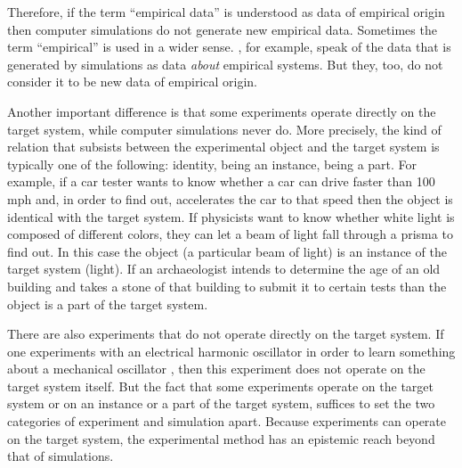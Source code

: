 \documentclass[12pt, a4paper]{article}
\numberwithin{equation}{section}
\begin{document}
Therefore, if the term ``empirical data'' is understood as data of
empirical origin then computer simulations do not generate new
empirical data. Sometimes the term ``empirical'' is used in a wider
sense. \citet[p. 560]{barberousse-et-al:2009}, for example, speak of
the data that is generated by simulations as data {\em about}
empirical systems. But they, too, do not consider it to be new data of
empirical origin.

Another important difference is that some experiments operate directly
on the target system, while computer simulations never do. More
precisely, the kind of relation that subsists between the experimental
object and the target system is typically one of the following:
identity, being an instance, being a part. For example, if a car
tester wants to know whether a car can drive faster than 100 mph and,
in order to find out, accelerates the car to that speed then the
object is identical with the target system. If physicists want to know
whether white light is composed of different colors, they can let a
beam of light fall through a prisma to find out. In this case the
object (a particular beam of light) is an instance of the target
system (light). If an archaeologist intends to determine the age of an
old building and takes a stone of that building to submit it to
certain tests than the object is a part of the target system.

There are also experiments that do not operate directly on the target
system. If one experiments with an electrical harmonic oscillator in
order to learn something about a mechanical oscillator \cite[p.
138]{hughes:1999}, then this experiment does not operate on the target
system itself. But the fact that some experiments operate on the
target system or on an instance or a part of the target system,
suffices to set the two categories of experiment and simulation apart.
Because experiments can operate on the target system, the experimental
method has an epistemic reach beyond that of simulations.
\end{document}
